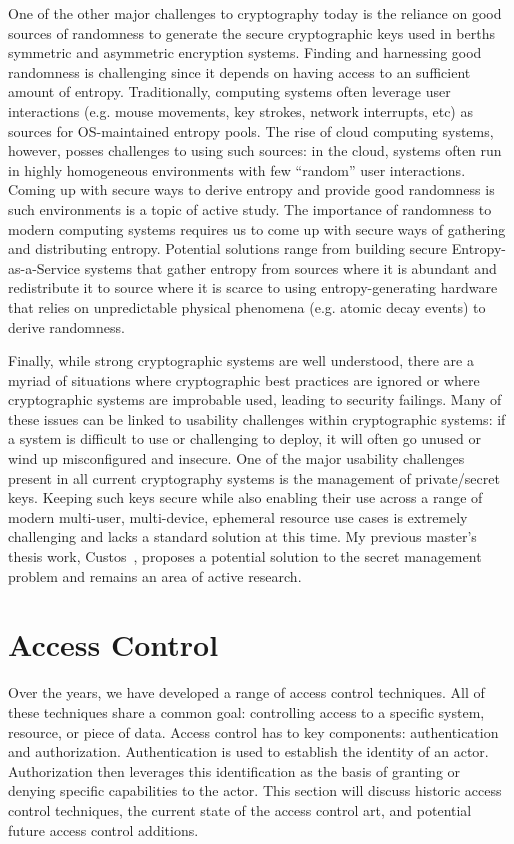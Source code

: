 \documentclass{sig-alternate}
\begin{document}
One of the other major challenges to cryptography today is the
reliance on good sources of randomness to generate the secure
cryptographic keys used in berths symmetric and asymmetric encryption
systems. Finding and harnessing good randomness is challenging since
it depends on having access to an sufficient amount of
entropy. Traditionally, computing systems often leverage user
interactions (e.g. mouse movements, key strokes, network interrupts,
etc) as sources for OS-maintained entropy pools. The rise of cloud
computing systems, however, posses challenges to using such sources:
in the cloud, systems often run in highly homogeneous environments
with few ``random'' user interactions. Coming up with secure ways to
derive entropy and provide good randomness is such environments is a
topic of active study. The importance of randomness to modern
computing systems requires us to come up with secure ways of gathering
and distributing entropy. Potential solutions range from building
secure Entropy-as-a-Service systems that gather entropy from sources
where it is abundant and redistribute it to source where it is scarce
to using entropy-generating hardware that relies on unpredictable
physical phenomena (e.g. atomic decay events) to derive randomness.

Finally, while strong cryptographic systems are well understood, there
are a myriad of situations where cryptographic best practices are
ignored or where cryptographic systems are improbable used, leading to
security failings. Many of these issues can be linked to usability
challenges within cryptographic systems: if a system is difficult to
use or challenging to deploy, it will often go unused or wind up
misconfigured and insecure. One of the major usability challenges
present in all current cryptography systems is the management of
private/secret keys. Keeping such keys secure while also enabling
their use across a range of modern multi-user, multi-device, ephemeral
resource use cases is extremely challenging and lacks a standard
solution at this time. My previous master's thesis work,
Custos~\cite{custos-masters}, proposes a potential solution to the
secret management problem and remains an area of active research.

\section{Access Control}
\label{sec:ac}

Over the years, we have developed a range of access control
techniques. All of these techniques share a common goal: controlling
access to a specific system, resource, or piece of data. Access
control has to key components: authentication and
authorization. Authentication is used to establish the identity of an
actor. Authorization then leverages this identification as the basis
of granting or denying specific capabilities to the actor. This
section will discuss historic access control techniques, the current
state of the access control art, and potential future access control
additions.
\end{document}
